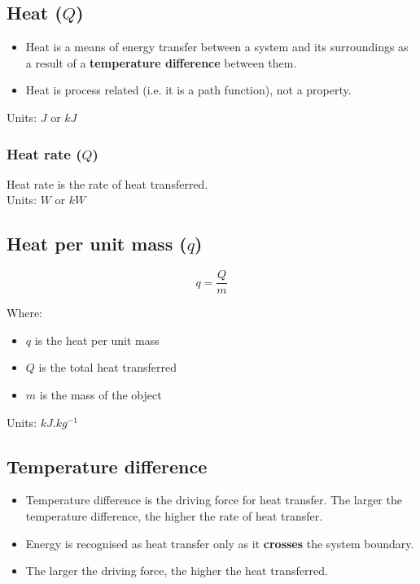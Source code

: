 \documentclass[11pt]{article}
\begin{document}
\subsection{Heat (\(Q\))}
\label{sec:orgcf2c8cf}
\begin{itemize}
\item Heat is a means of energy transfer between a system and its surroundings as a result of a \textbf{temperature difference} between them.
\item Heat is process related (i.e. it is a path function), not a property.
\end{itemize}

Units: \(\unit{J}\) or \(\unit{kJ}\)

\subsubsection{Heat rate (\(Q\))}
\label{sec:orgb328cc6}
Heat rate is the rate of heat transferred.
\\[0pt]

 \noindent Units: \(\unit{W}\) or \(\unit{kW}\)

\subsection{Heat per unit mass (\(q\))}
\label{sec:orgaf7112a}
\[q = \frac{Q}{m}\]

Where:
\begin{itemize}
\item \(q\) is the heat per unit mass
\item \(Q\) is the total heat transferred
\item \(m\) is the mass of the object
\end{itemize}

Units: \(\unit{kJ.kg^{-1}}\)

\subsection{Temperature difference}
\label{sec:org44b8782}
\begin{itemize}
\item Temperature difference is the driving force for heat transfer. The larger the temperature difference, the higher the rate of heat transfer.
\item Energy is recognised as heat transfer only as it \textbf{crosses} the system boundary.
\item The larger the driving force, the higher the heat transferred.
\end{itemize}
\end{document}
